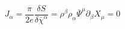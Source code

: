\begin{equation}
J_{\alpha}= \frac{\pi}{2e}\frac{\delta S}{\delta\bar{\chi}^{\alpha}}=\rho^{\beta}
\rho_{\alpha}\bar{\Psi}^{\mu}
\partial_{\beta}X_{\mu} = 0
\end{equation}


